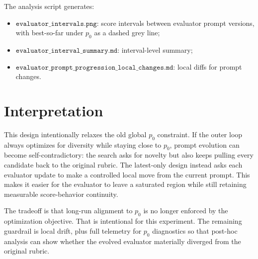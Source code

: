 \documentclass[11pt]{article}
\begin{document}
The analysis script generates:

\begin{itemize}
  \item \(\texttt{evaluator\_intervals.png}\): score intervals between evaluator
        prompt versions, with best-so-far under \(p_0\) as a dashed grey line;
  \item \(\texttt{evaluator\_interval\_summary.md}\): interval-level summary;
  \item \(\texttt{evaluator\_prompt\_progression\_local\_changes.md}\): local
        diffs for prompt changes.
\end{itemize}

\section{Interpretation}

This design intentionally relaxes the old global \(p_0\) constraint. If the
outer loop always optimizes for diversity while staying close to \(p_0\), prompt
evolution can become self-contradictory: the search asks for novelty but also
keeps pulling every candidate back to the original rubric. The latest-only design
instead asks each evaluator update to make a controlled local move from the
current prompt. This makes it easier for the evaluator to leave a saturated
region while still retaining measurable score-behavior continuity.

The tradeoff is that long-run alignment to \(p_0\) is no longer enforced by the
optimization objective. That is intentional for this experiment. The remaining
guardrail is local drift, plus full telemetry for \(p_0\) diagnostics so that
post-hoc analysis can show whether the evolved evaluator materially diverged from
the original rubric.
\end{document}
